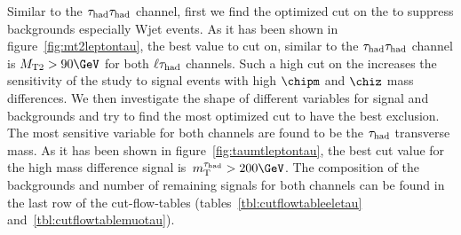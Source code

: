 Similar to the $\tau_{\rm had}\tau_{\rm had}$ channel, first we find the optimized cut on the \mttwo to suppress backgrounds especially Wjet events. As it has been shown in figure~\ref{fig:mt2leptontau}, the best value to cut on, similar to the $\tau_{\rm had}\tau_{\rm had}$ channel is $\mttwo > 90 \GeV$ for both $\ell\tau_{\rm had}$ channels. Such a high cut on the \mttwo increases the sensitivity of the study to signal events with high $\chipm$ and $\chiz$ mass differences. We then investigate the shape of different variables for signal and backgrounds and try to find the most optimized cut to have the best exclusion. The most sensitive variable for both channels are found to be the $\tau_{\rm had}$ transverse mass. As it has been shown in figure~\ref{fig:taumtleptontau}, the best cut value for the high mass difference signal is $\tauMT > 200 \GeV$. The composition of the backgrounds and number of remaining signals for both channels can be found in the last row of the cut-flow-tables (tables~\ref{tbl:cutflowtableeletau} and~\ref{tbl:cutflowtablemuotau}).

